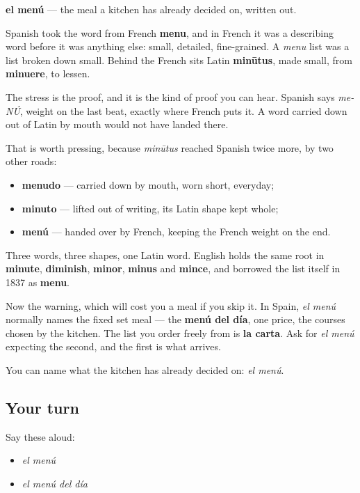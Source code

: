 \begin{cousinweb}
\textbf{el menú} — the meal a kitchen has already decided on, written out.

Spanish took the word from French \textbf{menu}, and in French it was a describing word before it was anything else: small, detailed, fine-grained. A \emph{menu} list was a list broken down small. Behind the French sits Latin \textbf{minūtus}, made small, from \textbf{minuere}, to lessen.

The stress is the proof, and it is the kind of proof you can hear. Spanish says \emph{me-NÚ}, weight on the last beat, exactly where French puts it. A word carried down out of Latin by mouth would not have landed there.

That is worth pressing, because \emph{minūtus} reached Spanish twice more, by two other roads:

\begin{itemize}
\raggedright
  \item \textbf{menudo} — carried down by mouth, worn short, everyday;
  \item \textbf{minuto} — lifted out of writing, its Latin shape kept whole;
  \item \textbf{menú} — handed over by French, keeping the French weight on the end.
\end{itemize}

Three words, three shapes, one Latin word. English holds the same root in \textbf{minute}, \textbf{diminish}, \textbf{minor}, \textbf{minus} and \textbf{mince}, and borrowed the list itself in 1837 as \textbf{menu}.

Now the warning, which will cost you a meal if you skip it. In Spain, \emph{el menú} normally names the fixed set meal — the \textbf{menú del día}, one price, the courses chosen by the kitchen. The list you order freely from is \textbf{la carta}. Ask for \emph{el menú} expecting the second, and the first is what arrives.
\end{cousinweb}

\begin{grammarlens}[title={What you've built}]
You can name what the kitchen has already decided on: \emph{el menú}.
\end{grammarlens}

\subsection*{Your turn}
Say these aloud:

\begin{itemize}
\raggedright
  \item \emph{el menú}
  \item \emph{el menú del día}
\end{itemize}

